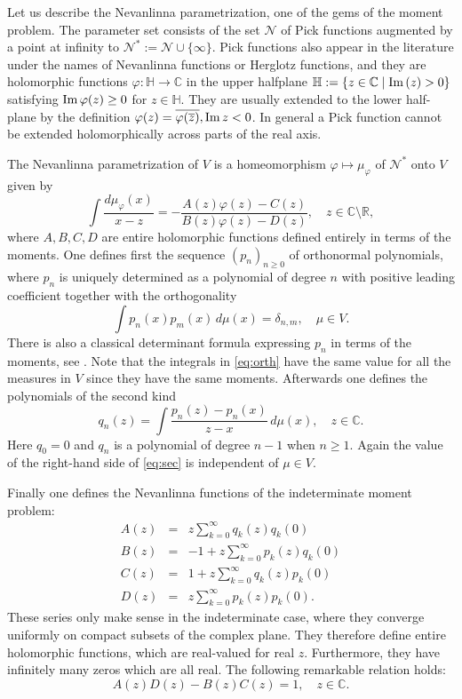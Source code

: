\documentclass [12pt]{article}
\def\Im{{\rm Im}\,}
\newcommand{\C}{\mathbb{C}}
\newcommand{\R}{\mathbb{R}}
\renewcommand{\H}{\mathbb{H}}
\begin{document}
Let us describe the Nevanlinna parametrization, one of the gems of the moment problem.
The parameter set consists of the set $\mathcal N$ of Pick functions augmented by  a point at infinity to $\mathcal N^*:=\mathcal N\cup\{\infty\}$. Pick functions also appear in the literature under the names of Nevanlinna functions or Herglotz functions, and they are holomorphic functions $\varphi:\H\to \C$ in the upper halfplane $\H:=\{z\in \C\mid \Im(z)>0\}$ satisfying $\Im \varphi(z)\ge 0$ for $z\in \H$. They are usually extended to the lower half-plane by the definition $\varphi(z)=\overline{\varphi(\overline{z})},\Im z<0$. In general a Pick function cannot be extended holomorphically across parts of the real axis.

The Nevanlinna parametrization of $V$ is a homeomorphism $\varphi\mapsto \mu_\varphi$ of $\mathcal N^*$ onto $V$ given by
\begin{equation}\label{eq:Nev}
\int \frac{d\mu_\varphi(x)}{x-z}=-\frac{A(z)\varphi(z)-C(z)}{B(z)\varphi(z)-D(z)},\quad z\in \C\setminus\R,
\end{equation}
where $A,B,C,D$ are entire holomorphic functions defined entirely in terms of the moments.
One defines first the sequence $(p_n)_{n\ge 0}$ of orthonormal polynomials, where $p_n$ is uniquely determined  as a polynomial of degree $n$ with positive leading coefficient together with the orthogonality
\begin{equation}\label{eq:orth}
\int p_n(x)p_m(x)\,d\mu(x)=\delta_{n,m},\quad \mu\in V.
\end{equation}
There is also a classical determinant formula expressing $p_n$  in terms of the moments, see \cite[formula (1.4)]{Ak}.  Note that the integrals in \eqref{eq:orth} have the same value for all the measures in $V$ since they have the same moments. Afterwards one  defines the polynomials of the second kind
\begin{equation}\label{eq:sec}
q_n(z)=\int \frac{p_n(z)-p_n(x)}{z-x}\,d\mu(x), \quad z\in\C.
\end{equation}
Here $q_0=0$ and $q_n$ is a polynomial of degree $n-1$ when $n\ge 1$. Again the value of the right-hand side of \eqref{eq:sec} is independent of $\mu\in V$.

Finally one defines the
Nevanlinna functions of the indeterminate moment problem:
\begin{eqnarray}
A(z)&=&z\sum_{k=0}^\infty q_k(z)q_k(0)\label{eq:A}\\
B(z)&=&-1+z\sum_{k=0}^\infty p_k(z)q_k(0) \label{eq:B}\\
C(z)&=&1+z\sum_{k=0}^\infty q_k(z)p_k(0)\label{eq:C}\\
D(z)&=&z\sum_{k=0}^\infty p_k(z)p_k(0)\label{eq:D}.
\end{eqnarray}
These series only make sense in the indeterminate case, where they converge uniformly on  compact subsets of the complex plane. They therefore define entire holomorphic functions, which are real-valued for real $z$. Furthermore, they have infinitely many  zeros which are all real. The following remarkable relation holds:
\begin{equation}\label{eq:det}
A(z)D(z)-B(z)C(z)=1,\quad z\in\C.
\end{equation}
\end{document}
